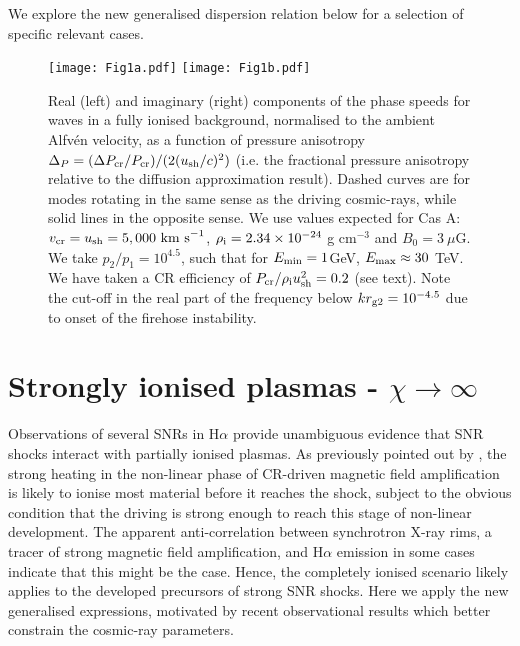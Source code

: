\documentclass[a4paper,fleqn,usenatbib]{mnras}
\begin{document}
We explore the new generalised dispersion relation below for a selection of specific relevant cases.

\begin{figure*}
	\begin{center}
		\texttt{[image: Fig1a.pdf]} 
		\texttt{[image: Fig1b.pdf]}
	\end{center}
	
	\caption{Real (left) and imaginary (right) components of the phase speeds for waves in a fully ionised background, normalised to the ambient Alfv\'en velocity, as a function of pressure anisotropy $\Delta_P = (\Delta P_{\rm cr}/P_{\rm cr})/(2 (u_{\rm sh}/c)^2)$ (i.e. the fractional pressure anisotropy relative to the diffusion approximation result). Dashed curves are for modes rotating in the same sense as the driving cosmic-rays, while solid lines in the opposite sense. We use values expected for Cas A:  $v_{\rm cr}=u_{\rm sh} = 5,000~{\rm km~s}^{-1}$, $\rho_{\rm i} = 2.34\times 10^{-24}$ g  cm$^{-3}$ and $B_0 = 3~\mu$G. We take $p_{2}/p_{1} = 10^{4.5}$, such that for $E_{\rm min}=1$GeV, $E_{\rm max}\approx 30$ TeV. We have taken a CR efficiency of $P_{\rm cr}/\rho_{\rm i} u_{\rm sh}^2 = 0.2$ (see text). Note the cut-off in the real part of the frequency below $k r_{\rm g2} = 10^{-4.5}$ due to onset of the firehose instability.}
	\label{fig:1}
\end{figure*}



\section{Strongly ionised plasmas - $\chi \rightarrow \infty$}
\label{sec:3}

Observations of several SNRs in H$\alpha$ provide unambiguous evidence that SNR shocks interact with partially ionised plasmas. As previously pointed out by \cite{Reville13}, the strong heating in the non-linear phase of CR-driven magnetic field amplification is likely to ionise most material before it reaches the shock, subject to the obvious condition that the driving is strong enough to reach this stage of non-linear development. The apparent anti-correlation between synchrotron X-ray rims, a tracer of strong magnetic field amplification, and H$\alpha$ emission in some cases \citep{Winkler} indicate that this might be the case. Hence, the completely ionised scenario likely applies to the developed precursors of strong SNR shocks. 
Here we apply the new generalised expressions, motivated by recent observational results which better constrain the cosmic-ray parameters. 
\end{document}
